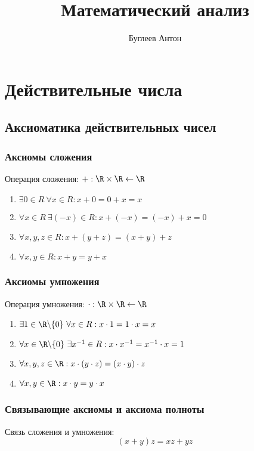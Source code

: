 \documentclass[a4paper, 14pt]{article}
\title{Математический анализ}
\author{Буглеев Антон}
\date{}
\begin{document}
    \maketitle
    
    \section{Действительные числа}
    \subsection{Аксиоматика действительных чисел}
    \subsubsection*{Аксиомы сложения}

    Операция сложения: $+: \R \times \R \leftarrow \R$

    \begin{enumerate}
        \item $\exists 0 \in R \ \forall x \in R: x + 0 = 0 + x = x$
        \item $\forall x \in R \ \exists (-x) \in R: x + (-x) = (-x) + x = 0$
        \item $\forall x, y, z \in R: x + (y + z) = (x + y) + z$
        \item $\forall x, y \in R: x + y = y + x$
    \end{enumerate}

    \subsubsection*{Аксиомы умножения}
    Операция умножения: $\cdot: \R \times \R \leftarrow \R$

    \begin{enumerate}
        \item $\exists 1 \in \R \backslash \{0\} \ \forall x \in R: x\cdot 1 = 1\cdot x = x$
        \item $\forall x \in \R \backslash \{0\} \ \exists x^{-1} \in R: x \cdot x^{-1} = x^{-1} \cdot x = 1$
        \item $\forall x,y,z \in \R: x \cdot (y \cdot z) = (x \cdot y) \cdot z$
        \item $\forall x,y \in \R: x \cdot y = y \cdot x$
    \end{enumerate}


    \subsubsection*{Связывающие аксиомы и аксиома полноты}
    Связь сложения и умножения: \[(x+y)z = xz + yz\]
\end{document}
